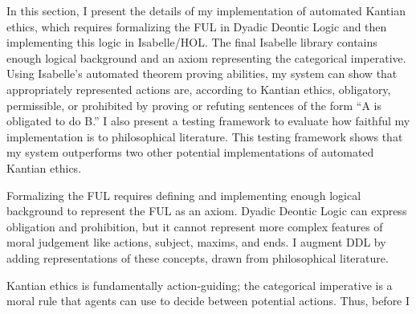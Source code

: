 %
\begin{isabellebody}%
%
%
\isadelimtheory
%
\endisadelimtheory
%
\isatagtheory
%
\endisatagtheory
{\isafoldtheory}%
%
\isadelimtheory
%
\endisadelimtheory
%
\isadelimdocument
%
\endisadelimdocument
%
\isatagdocument
%
\isamarkuptrue%
%
\endisatagdocument
{\isafolddocument}%
%
\isadelimdocument
%
\endisadelimdocument
%
\begin{isamarkuptext}%
In this section, I present the details of my implementation of automated Kantian ethics, which requires
formalizing the FUL in Dyadic Deontic Logic and then implementing this logic in Isabelle/HOL. The final
Isabelle library contains enough logical background and an axiom representing the categorical imperative. 
Using Isabelle's automated theorem proving abilities, my system can show that appropriately represented
actions are, according to Kantian ethics, obligatory, permissible, or prohibited by proving or refuting sentences of the form ``A 
is obligated to do B.'' I also present a testing framework to evaluate how faithful my implementation is 
to philosophical literature. This testing framework shows that my system outperforms two other potential 
implementations of automated Kantian ethics.%
\end{isamarkuptext}\isamarkuptrue%
%
\isadelimdocument
%
\endisadelimdocument
%
\isatagdocument
%
\isamarkuptrue%
%
\endisatagdocument
{\isafolddocument}%
%
\isadelimdocument
%
\endisadelimdocument
%
\begin{isamarkuptext}%
Formalizing the FUL requires defining and implementing enough logical background to represent 
the FUL as an axiom. Dyadic
Deontic Logic can express obligation and prohibition, but it cannot represent more complex features of 
moral judgement like actions, subject, maxims, and ends. I augment DDL by adding representations 
of these concepts, drawn from philosophical literature.%
\end{isamarkuptext}\isamarkuptrue%
%
\isadelimdocument
%
\endisadelimdocument
%
\isatagdocument
%
\isamarkuptrue%
%
\endisatagdocument
{\isafolddocument}%
%
\isadelimdocument
%
\endisadelimdocument
%
\begin{isamarkuptext}%
Kantian ethics is fundamentally action-guiding; the categorical
imperative is a moral rule that agents can use to decide between potential actions. Thus, before I 

\end{isamarkuptext}
\end{isabellebody}
